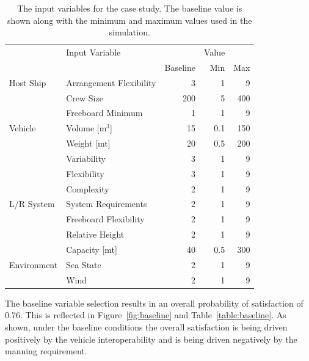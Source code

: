 \documentclass{svproc}
\begin{document}
\begin{table}[htb]
\begin{center}
\caption{The input variables for the case study. The baseline value is shown along with the minimum and maximum values used in the simulation.}
\begin{tabular}{l l r r r}
\hline
 & Input Variable & & Value                &     \\
               &                         & Baseline & Min & Max \\
\hline
Host Ship      & Arrangement Flexibility & 3    & 1   & 9   \\
               & Crew Size               & 200  & 5   & 400 \\
               & Freeboard Minimum       & 1    & 1   & 9   \\
Vehicle        & Volume [m$^3$]          & 15   & 0.1 & 150 \\
               & Weight [mt]             & 20   & 0.5 & 200 \\
               & Variability             & 3    & 1   & 9   \\
               & Flexibility             & 3    & 1   & 9   \\
               & Complexity              & 2    & 1   & 9   \\
L/R System     & System Requirements     & 2    & 1   & 9   \\
               & Freeboard Flexibility   & 2    & 1   & 9   \\
               & Relative Height         & 2    & 1   & 9   \\
               & Capacity [mt]           & 40   & 0.5 & 300 \\
Environment    & Sea State               & 2    & 1   & 9   \\
               & Wind                    & 2    & 1   & 9   \\
\hline
\end{tabular}
\label{table:input}
\end{center}
\end{table}

The baseline variable selection results in an overall probability of satisfaction of 0.76. This is reflected in Figure~\ref{fig:baseline} and Table~\ref{table:baseline}. As shown, under the baseline conditions the overall satisfaction is being driven positively by the vehicle interoperability and is being driven negatively by the manning requirement. 
\end{document}
